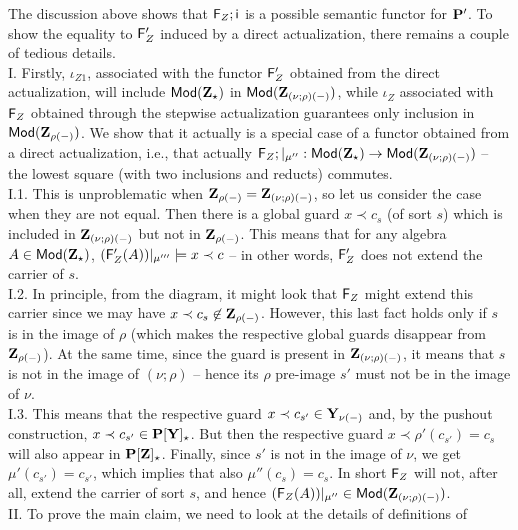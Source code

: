 \begin{PROOF}
The discussion above shows that ${\sf {F}}_Z;{\sf {i}}$ is a possible semantic
functor for ${\bf P}'$. To show the equality to ${\sf {F}}'_Z$ induced by a direct
actualization, there remains a couple of tedious  details. 
\\[1ex]
I. Firstly, $\iota_{Z1}$, associated with the functor ${\sf {F}}'_Z$ obtained from the direct
actualization, will include ${\sf {Mod}}({\bf Z}_\star)$ 
in ${\sf {Mod}}({\bf Z}_{(\nu;\rho)(-)})$, while $\iota_Z$ associated with ${\sf {F}}_Z$ obtained through the stepwise actualization guarantees only inclusion in
${\sf {Mod}}({\bf Z_{\rho(-)}})$. 
We show that it actually is a special case
of a functor obtained from a direct actualization, i.e., that actually ${\sf {F}}_Z;|_{\mu''}:{\sf {Mod}}({\bf Z_\star})\to {\sf {Mod}}({\bf Z_{(\nu;\rho)(-)}})$ --
the lowest square (with two inclusions and reducts) commutes.
\\[1ex]
I.1. This is unproblematic when ${\bf Z}_{\rho(-)}={\bf Z}_{(\nu;\rho)(-)}$,
so let us consider the case when they are not equal. Then there is a global
guard $x\prec c_s$ (of sort $s$) which is included in ${\bf Z}_{(\nu;\rho)(-)}$ but not in
${\bf Z}_{\rho(-)}$. This means that for any algebra
$A\in{\sf {Mod}}({\bf Z_\star})$, $({\sf {F}}'_Z(A))|_{\mu'''}\models x\prec c$ -- in
other words, ${\sf {F}}'_Z$ does not extend the carrier of $s$. 
\\[1ex]
I.2. In principle,
from the diagram, it might look that ${\sf {F}}_Z$ might extend this carrier
since we may have $x\prec c_s \not\in {\bf Z}_{\rho(-)}$. However, this
last fact holds only if $s$ is in the image of $\rho$ (which makes the
respective global guards disappear from ${\bf Z}_{\rho(-)}$). At the same
time, since the guard is present in ${\bf Z}_{(\nu;\rho)(-)}$, it means
that $s$ is not in the image of $(\nu;\rho)$ -- hence its $\rho$ pre-image $s'$ must not be in the
image of $\nu$. 
\\[1ex]
I.3. This means that the respective guard $x\prec c_{s'}\in {\bf Y}_{\nu(-)}$ and, by the pushout construction, 
$x\prec c_{s'}\in {\bf P[Y]_\star}$. But then the respective guard $x\prec
\rho'(c_{s'})=c_s$ will also appear in ${\bf P[Z]_\star}$. Finally, since $s'$ is
not in the image of $\nu$, we get $\mu'(c_{s'})=c_{s'}$, which implies that
also $\mu''(c_{s})=c_{s}$. In short ${\sf {F}}_Z$ will not, after all, extend
the carrier of sort $s$, and hence $({\sf {F}}_Z(A))|_{\mu''} \in {\sf {Mod}}({\bf Z}_{(\nu;\rho)(-)})$. 
\\[1ex]
II. To prove the main claim, we need to look at the details of definitions of

\end{PROOF}
